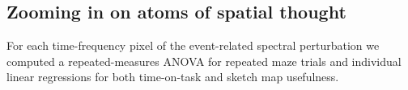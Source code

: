 \subsection{Zooming in on atoms of spatial thought}

For each time-frequency pixel of the event-related spectral perturbation we computed a repeated-measures ANOVA for repeated maze trials and individual linear regressions for both time-on-task and sketch map usefulness.

